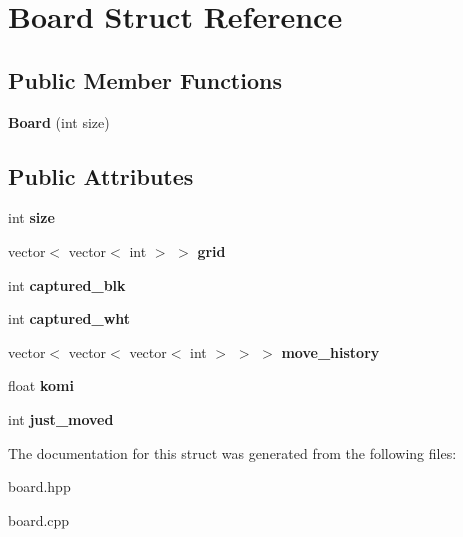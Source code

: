 \hypertarget{struct_board}{\section{Board Struct Reference}
\label{struct_board}
}
\subsection*{Public Member Functions}
\begin{DoxyCompactItemize}
\item 
\hypertarget{struct_board_a23ec051234acfe51d94664f9ad52a469}{{\bfseries Board} (int size)}\label{struct_board_a23ec051234acfe51d94664f9ad52a469}

\end{DoxyCompactItemize}
\subsection*{Public Attributes}
\begin{DoxyCompactItemize}
\item 
\hypertarget{struct_board_aedef7105f0accc0949b601afa97e9678}{int {\bfseries size}}\label{struct_board_aedef7105f0accc0949b601afa97e9678}

\item 
\hypertarget{struct_board_a870ea64f5b7464a5d01529c877652585}{vector$<$ vector$<$ int $>$ $>$ {\bfseries grid}}\label{struct_board_a870ea64f5b7464a5d01529c877652585}

\item 
\hypertarget{struct_board_a3a0bcd4cfe7f67346db22a9d697e0e5b}{int {\bfseries captured\-\_\-blk}}\label{struct_board_a3a0bcd4cfe7f67346db22a9d697e0e5b}

\item 
\hypertarget{struct_board_a0f3359ee5387e424c4dafb80da0bd72e}{int {\bfseries captured\-\_\-wht}}\label{struct_board_a0f3359ee5387e424c4dafb80da0bd72e}

\item 
\hypertarget{struct_board_a163136ca917387f8f51083dd824b9a30}{vector$<$ vector$<$ vector$<$ int $>$ $>$ $>$ {\bfseries move\-\_\-history}}\label{struct_board_a163136ca917387f8f51083dd824b9a30}

\item 
\hypertarget{struct_board_a5ba40e1581d9edf91b143245fcc15337}{float {\bfseries komi}}\label{struct_board_a5ba40e1581d9edf91b143245fcc15337}

\item 
\hypertarget{struct_board_ac5b74ec5665a5a73ceb9f2664c393cab}{int {\bfseries just\-\_\-moved}}\label{struct_board_ac5b74ec5665a5a73ceb9f2664c393cab}

\end{DoxyCompactItemize}


The documentation for this struct was generated from the following files\-:\begin{DoxyCompactItemize}
\item 
board.\-hpp\item 
board.\-cpp\end{DoxyCompactItemize}
